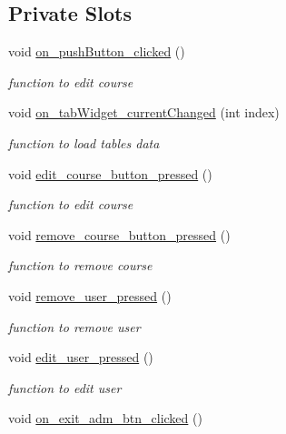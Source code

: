 \subsection*{Private Slots}
\begin{DoxyCompactItemize}
\item 
void \hyperlink{classClientControl_a8f9b32ace74f3152e1781ca73d60a90d}{on\+\_\+push\+Button\+\_\+clicked} ()
\begin{DoxyCompactList}\small\item\em function to edit course \end{DoxyCompactList}\item 
void \hyperlink{classClientControl_a8d716e92624ff6d05525dfee0fbd9a30}{on\+\_\+tab\+Widget\+\_\+current\+Changed} (int index)
\begin{DoxyCompactList}\small\item\em function to load table\textquotesingle{}s data \end{DoxyCompactList}\item 
void \hyperlink{classClientControl_a830f0e76e43c64fee40bbcd542e1e355}{edit\+\_\+course\+\_\+button\+\_\+pressed} ()
\begin{DoxyCompactList}\small\item\em function to edit course \end{DoxyCompactList}\item 
void \hyperlink{classClientControl_a759a2a2c0470f7903e053ef534cea4db}{remove\+\_\+course\+\_\+button\+\_\+pressed} ()
\begin{DoxyCompactList}\small\item\em function to remove course \end{DoxyCompactList}\item 
void \hyperlink{classClientControl_a09604fd71dee98f12cd46c3252f1cabe}{remove\+\_\+user\+\_\+pressed} ()
\begin{DoxyCompactList}\small\item\em function to remove user \end{DoxyCompactList}\item 
void \hyperlink{classClientControl_a2c9466ca951a1b8c32f24e4ab1389ba5}{edit\+\_\+user\+\_\+pressed} ()
\begin{DoxyCompactList}\small\item\em function to edit user \end{DoxyCompactList}\item 
void \hyperlink{classClientControl_a52bd587841a7a49f3e86ca09c2e3372d}{on\+\_\+exit\+\_\+adm\+\_\+btn\+\_\+clicked} ()

\end{DoxyCompactItemize}
